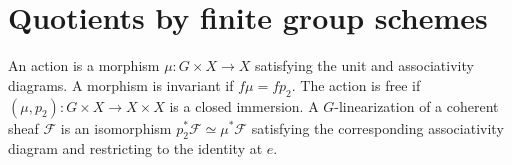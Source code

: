 \section{Quotients by finite group schemes}
\label{mumford-III12-source}

\begin{definition}
\label{mumford-def-group-scheme-action}
An action is a morphism $\mu:G\times X\to X$ satisfying the unit and
associativity diagrams. A morphism is invariant if $f\mu=fp_2$. The action
is free if $(\mu,p_2):G\times X\to X\times X$ is a closed immersion.
A $G$-linearization of a coherent sheaf $\mathcal F$ is an isomorphism
$p_2^*\mathcal F\simeq\mu^*\mathcal F$ satisfying the corresponding
associativity diagram and restricting to the identity at $e$.
\end{definition}

